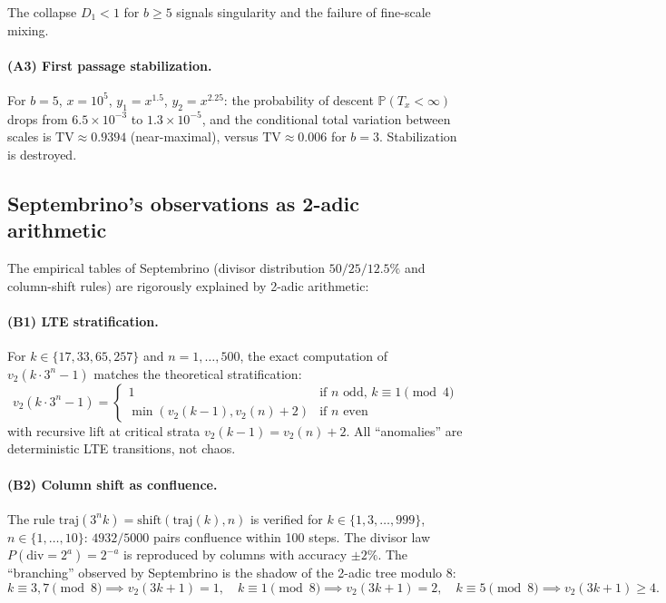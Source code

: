 \documentclass[12pt,a4paper]{article}
\begin{document}
The collapse $D_1 < 1$ for $b \ge 5$ signals singularity and the failure of 
fine-scale mixing.

\paragraph{(A3) First passage stabilization.} For $b=5$, $x = 10^5$, $y_1 = x^{1.5}$, 
$y_2 = x^{2.25}$: the probability of descent $\mathbb{P}(T_x < \infty)$ drops from 
$6.5 \times 10^{-3}$ to $1.3 \times 10^{-5}$, and the conditional total variation 
between scales is $\mathrm{TV} \approx 0.9394$ (near-maximal), versus $\mathrm{TV} \approx 0.006$ 
for $b=3$. Stabilization is destroyed.

\subsection{Septembrino's observations as 2-adic arithmetic}

The empirical tables of Septembrino (divisor distribution $50/25/12.5\%$ and 
column-shift rules) are rigorously explained by 2-adic arithmetic:

\paragraph{(B1) LTE stratification.} For $k \in \{17, 33, 65, 257\}$ and 
$n = 1, \ldots, 500$, the exact computation of $v_2(k \cdot 3^n - 1)$ matches 
the theoretical stratification:
\[
v_2(k \cdot 3^n - 1) = 
\begin{cases}
1 & \text{if } n \text{ odd, } k \equiv 1 \pmod 4 \\
\min(v_2(k-1), v_2(n)+2) & \text{if } n \text{ even}
\end{cases}
\]
with recursive lift at critical strata $v_2(k-1) = v_2(n)+2$. All ``anomalies'' 
are deterministic LTE transitions, not chaos.

\paragraph{(B2) Column shift as confluence.} The rule $\mathrm{traj}(3^n k) = 
\mathrm{shift}(\mathrm{traj}(k), n)$ is verified for $k \in \{1, 3, \ldots, 999\}$, 
$n \in \{1, \ldots, 10\}$: $4932/5000$ pairs confluence within 100 steps. The 
divisor law $P(\mathrm{div} = 2^a) = 2^{-a}$ is reproduced by columns with 
accuracy $\pm 2\%$. The ``branching'' observed by Septembrino is the shadow of 
the 2-adic tree modulo 8:
\[
k \equiv 3, 7 \pmod 8 \implies v_2(3k+1) = 1, \quad
k \equiv 1 \pmod 8 \implies v_2(3k+1) = 2, \quad
k \equiv 5 \pmod 8 \implies v_2(3k+1) \ge 4.
\]
\end{document}
